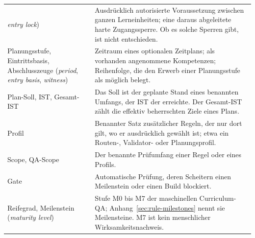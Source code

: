 \begin{longtable}{@{}P{42mm}P{106mm}@{}}
\emph{entry lock}) & Ausdrücklich autorisierte Voraussetzung zwischen
ganzen Lerneinheiten; eine daraus abgeleitete harte Zugangssperre. Ob es
solche Sperren gibt, ist nicht entschieden.\\
Planungsstufe, Eintrittsbasis, Abschlusszeuge (\emph{period},
\emph{entry basis}, \emph{witness}) & Zeitraum eines optionalen Zeitplans;
als vorhanden angenommene Kompetenzen; Reihenfolge, die den Erwerb einer
Planungsstufe als möglich belegt.\\
Plan-Soll, IST, Gesamt-IST & Das Soll ist der geplante Stand eines
benannten Umfangs, der IST der erreichte. Der Gesamt-IST zählt die effektiv
beherrschten Ziele eines Plans.\\
Profil & Benannter Satz zusätzlicher Regeln, der nur dort gilt, wo er
ausdrücklich gewählt ist; etwa ein Routen-, Validator- oder Planungsprofil.\\
Scope, QA-Scope & Der benannte Prüfumfang einer Regel oder eines Profils.\\
Gate & Automatische Prüfung, deren Scheitern einen Meilenstein oder einen
Build blockiert.\\
Reifegrad, Meilenstein (\emph{maturity level}) & Stufe M0 bis M7 der
maschinellen Curriculum-QA; Anhang~\ref{sec:rule-milestones} nennt sie
Meilensteine. M7 ist kein menschlicher Wirksamkeitsnachweis.\\
\bottomrule
\end{longtable}
\endgroup

